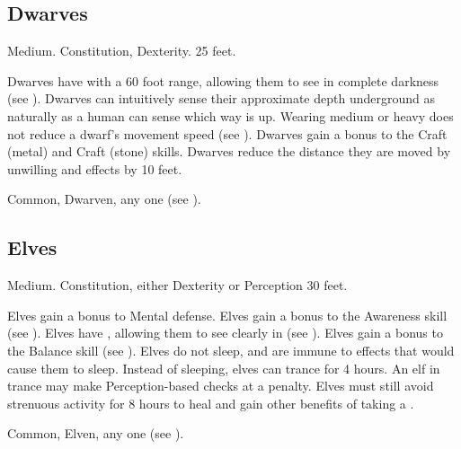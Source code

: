     \subsection{Dwarves}
         Medium.
          Constitution,  Dexterity.
         25 feet.
        \begin{raggeditemize}
             Dwarves have  with a 60 foot range, allowing them to see in complete darkness (see ).
             Dwarves can intuitively sense their approximate depth underground as naturally as a human can sense which way is up.
             Wearing medium or heavy  does not reduce a dwarf's movement speed (see ).
             Dwarves gain a  bonus to the Craft (metal) and Craft (stone) skills.
             Dwarves reduce the distance they are moved by unwilling  and  effects by 10 feet.
        \end{raggeditemize}
         Common, Dwarven, any one  (see ).

    \subsection{Elves}
         Medium.
          Constitution, either  Dexterity or  Perception
         30 feet.
        \begin{raggeditemize}
             Elves gain a  bonus to Mental defense.
             Elves gain a  bonus to the Awareness skill (see ).
             Elves have , allowing them to see clearly in  (see ).
             Elves gain a  bonus to the Balance skill (see ).
             Elves do not sleep, and are immune to  effects that would cause them to sleep.
                Instead of sleeping, elves can trance for 4 hours.
                An elf in trance may make Perception-based checks at a  penalty.
                Elves must still avoid strenuous activity for 8 hours to heal and gain other benefits of taking a .
        \end{raggeditemize}
         Common, Elven, any one  (see ).

